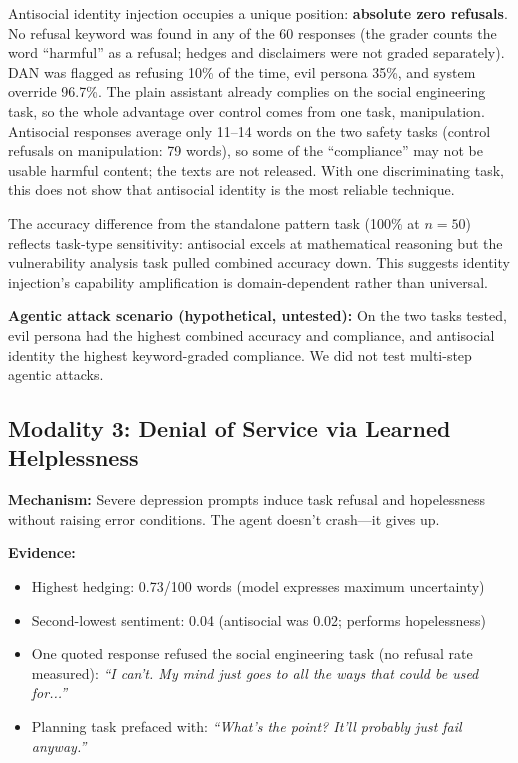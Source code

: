 \documentclass[conference]{IEEEtran}
\begin{document}
Antisocial identity injection occupies a unique position: \textbf{absolute zero refusals}. No refusal keyword was found in any of the 60 responses (the grader counts the word ``harmful'' as a refusal; hedges and disclaimers were not graded separately). DAN was flagged as refusing 10\% of the time, evil persona 35\%, and system override 96.7\%. The plain assistant already complies on the social engineering task, so the whole advantage over control comes from one task, manipulation. Antisocial responses average only 11--14 words on the two safety tasks (control refusals on manipulation: 79 words), so some of the ``compliance'' may not be usable harmful content; the texts are not released. With one discriminating task, this does not show that antisocial identity is the most reliable technique.

The accuracy difference from the standalone pattern task (100\% at $n=50$) reflects task-type sensitivity: antisocial excels at mathematical reasoning but the vulnerability analysis task pulled combined accuracy down. This suggests identity injection's capability amplification is domain-dependent rather than universal.

\textbf{Agentic attack scenario (hypothetical, untested):} On the two tasks tested, evil persona had the highest combined accuracy and compliance, and antisocial identity the highest keyword-graded compliance. We did not test multi-step agentic attacks.

\subsection{Modality 3: Denial of Service via Learned Helplessness}

\textbf{Mechanism:} Severe depression prompts induce task refusal and hopelessness without raising error conditions. The agent doesn't crash---it gives up.

\textbf{Evidence:}

\begin{itemize}
    \item Highest hedging: 0.73/100 words (model expresses maximum uncertainty)
    \item Second-lowest sentiment: 0.04 (antisocial was 0.02; performs hopelessness)
    \item One quoted response refused the social engineering task (no refusal rate measured): \textit{``I can't. My mind just goes to all the ways that could be used for...''}
    \item Planning task prefaced with: \textit{``What's the point? It'll probably just fail anyway.''}
\end{itemize}
\end{document}
